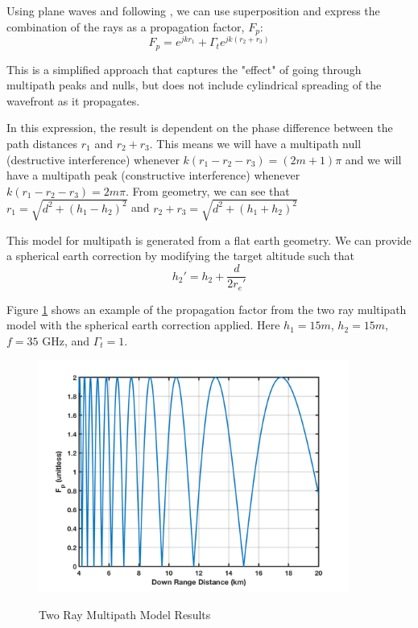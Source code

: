 Using plane waves and following \cite{lohrmann_rcs}, we can use superposition and express the combination of the rays as a propagation factor, $F_p$:
  \begin{equation}
  \label{env_eq:3b}
F_p = e^{jkr_1} + \Gamma_te^{jk\left(r_2 + r_3\right)}
\end{equation}

This is a simplified approach that captures the "effect" of going through multipath peaks and nulls, but does not include cylindrical spreading of the wavefront as it propagates.

In this expression, the result is dependent on the phase difference between the path distances $r_1$ and $r_2 + r_3$. This means we will have a multipath null (destructive interference) whenever $k\left(r_1 - r_2 - r_3\right) = (2m + 1)\pi$ and we will have a multipath peak (constructive interference) whenever $k\left(r_1 - r_2 - r_3\right) = 2m\pi$. From geometry, we can see that $r_1 = \sqrt{d^2 + (h_1-h_2)^2}$ and $r_2 + r_3 = \sqrt{d^2 + (h_1+h_2)^2}$

This model for multipath is generated from a flat earth geometry. We can provide a spherical earth correction by modifying the target altitude \cite{blake_radar} such that
\begin{equation}
  \label{env_eq:3r}
h_2' = h_2 + \frac{d}{2r_e'}
\end{equation}

Figure \ref{env_fig:3t} shows an example of the propagation factor from the two ray multipath model with the spherical earth correction applied. Here $h_1 = 15m$, $h_2 = 15m$, $f = 35$ GHz, and $\Gamma_t = 1$. 
\begin{figure}[H]
  \begin{center}
\includegraphics[width=4in]{../media/multistatic/two_ray_multipath_results.png}
  \end{center}
  \renewcommand{\baselinestretch}{1} \small\normalsize
  \begin{quote}
    \caption[Two Ray Multipath Model Results]{Two Ray Multipath Model Results\label{env_fig:3t}}
  \end{quote}
\end{figure}
\renewcommand{\baselinestretch}{2} \small\normalsize

